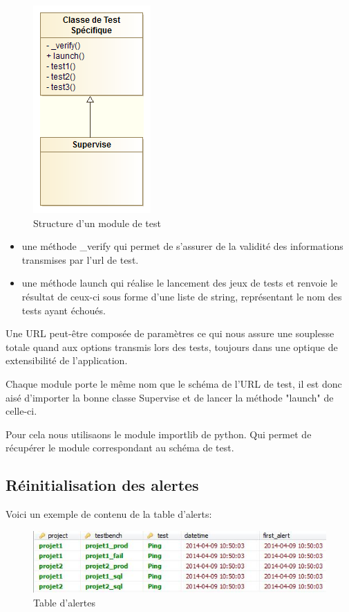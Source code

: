 \begin{figure}[h!]
	\centering
	\includegraphics[scale=0.4]{images/cyavision_module_de_tests.png}
	\caption{Structure d'un module de test}
\end{figure}

\begin{itemize}
\item  une méthode \_verify qui permet de s'assurer de la validité des informations transmises par l'url de test.
\item une méthode launch qui réalise le lancement des jeux  de tests et renvoie le résultat de ceux-ci sous forme d'une liste de string, représentant le nom des tests ayant échoués.
\end{itemize}

Une URL peut-être composée de paramètres ce qui nous assure une souplesse totale quand aux options transmis lors des tests, toujours dans une optique de extensibilité de l'application.

Chaque module porte le même nom que le schéma de l'URL de test, il est donc aisé d'importer la bonne classe Supervise et de lancer la méthode "launch" de celle-ci.

Pour cela nous utilisaons le module importlib de python. Qui permet de récupérer le module correspondant au schéma de test.

\newpage

\subsection*{Réinitialisation des alertes}

Voici un exemple de contenu de la table d'alerts:

\begin{figure}[h!]
	\centering
	\includegraphics[scale=0.4]{images/cyavision_alerts_db.jpg}
	\caption{Table d'alertes}
\end{figure}

